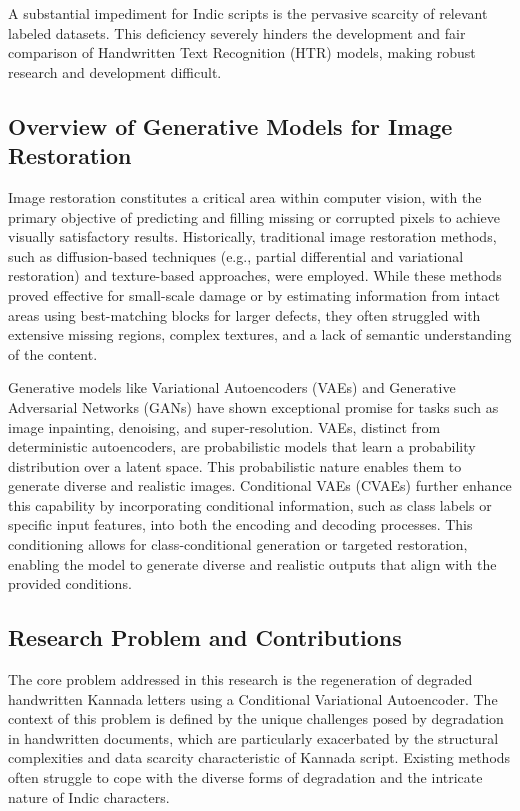 \documentclass[conference]{IEEEtran}
\begin{document}
A substantial impediment for Indic scripts is the pervasive scarcity of relevant labeled datasets. This deficiency severely hinders the development and fair comparison of Handwritten Text Recognition (HTR) models, making robust research and development difficult.\cite{Ramesh2024, Hebbi2023}

\subsection{Overview of Generative Models for Image Restoration}
\justify
Image restoration constitutes a critical area within computer vision, with the primary objective of predicting and filling missing or corrupted pixels to achieve visually satisfactory results. Historically, traditional image restoration methods, such as diffusion-based techniques (e.g., partial differential and variational restoration) and texture-based approaches, were employed. While these methods proved effective for small-scale damage or by estimating information from intact areas using best-matching blocks for larger defects, they often struggled with extensive missing regions, complex textures, and a lack of semantic understanding of the content.

Generative models like Variational Autoencoders (VAEs) and Generative Adversarial Networks (GANs) have shown exceptional promise for tasks such as image inpainting, denoising, and super-resolution.\cite{Davis2020, Emuru2023, Bhunia2023, Ahmed2024} VAEs, distinct from deterministic autoencoders, are probabilistic models that learn a probability distribution over a latent space. This probabilistic nature enables them to generate diverse and realistic images.\cite{Kumar2020} Conditional VAEs (CVAEs) further enhance this capability by incorporating conditional information, such as class labels or specific input features, into both the encoding and decoding processes. This conditioning allows for class-conditional generation or targeted restoration, enabling the model to generate diverse and realistic outputs that align with the provided conditions.\cite{Kumar2020, Graves2013}

\subsection{Research Problem and Contributions}
\justify
The core problem addressed in this research is the regeneration of degraded handwritten Kannada letters using a Conditional Variational Autoencoder. The context of this problem is defined by the unique challenges posed by degradation in handwritten documents, which are particularly exacerbated by the structural complexities and data scarcity characteristic of Kannada script. Existing methods often struggle to cope with the diverse forms of degradation and the intricate nature of Indic characters.\cite{Davis2020, Emuru2023, Bhunia2023}
\end{document}
